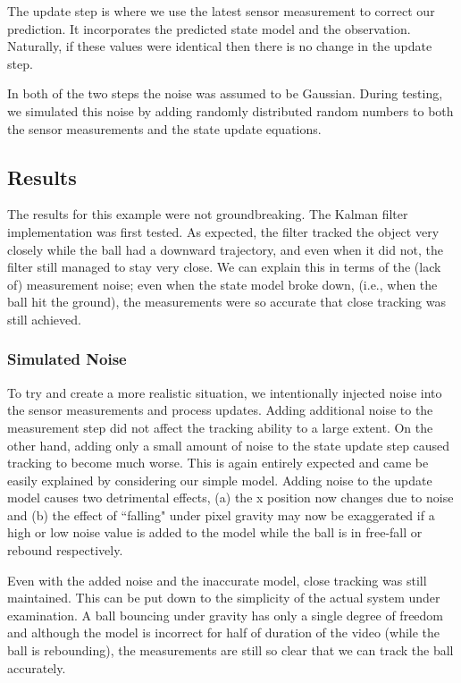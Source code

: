 The update step is where we use the latest sensor measurement to correct our
prediction. It incorporates the predicted state model and the observation. Naturally,
if these values were identical then there is no change in the update step.

In both of the two steps the noise was assumed to be Gaussian. During testing,
we simulated this noise by adding randomly distributed random numbers to both
the sensor measurements and the state update equations.

\subsection{Results}
The results for this example were not groundbreaking. The Kalman filter
implementation was first tested. As expected, the filter
tracked the object very closely while the ball had a downward trajectory, and
even when it did not, the filter still managed to stay very close. We can explain
this in terms of the (lack of) measurement noise; even when the state model broke down,
(i.e., when the ball hit the ground), the measurements were so accurate
that close tracking was still achieved.

\subsubsection{Simulated Noise}
To try and create a more realistic situation, we intentionally injected noise into
the sensor measurements and process updates. Adding additional noise to the measurement
step did not affect the tracking ability to a large extent. On the other hand,
adding only a small amount of noise to the state update step caused tracking to
become much worse. This is again entirely expected and came be easily explained
by considering our simple model. Adding noise to the update model causes two
detrimental effects, (a) the x position now changes due to noise and (b) the
effect of ``falling" under pixel gravity may now be exaggerated if a high or low
noise value is added to the model while the ball is in free-fall or rebound respectively.

Even with the added noise and the inaccurate model, close tracking was still
maintained. This can be put down to the simplicity of the actual system under
examination. A ball bouncing under gravity has only a single degree of freedom
and although the model is incorrect for half of duration of the video (while
the ball is rebounding), the measurements are still so clear that we can track
the ball accurately.

